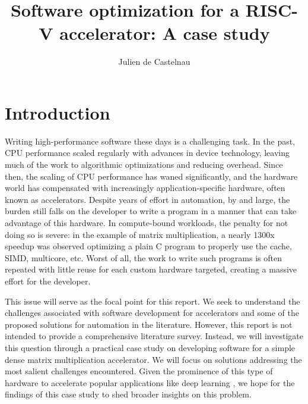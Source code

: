 \documentclass[acmsmall, nonacm=true]{acmart}
\begin{document}
\sloppy %

\title{Software optimization for a RISC-V accelerator: A case study}

\author{Julien de Castelnau}

\renewcommand{\shortauthors}{de Castelnau}


\maketitle

\section{Introduction} 
Writing high-performance software these days is a challenging task. In the past, CPU performance scaled regularly with advances in device technology, leaving much of the work to algorithmic optimizations and reducing overhead. Since then, the scaling of CPU performance has waned significantly, and the hardware world has compensated with increasingly application-specific hardware, often known as accelerators. Despite years of effort in automation, by and large, the burden still falls on the developer to write a program in a manner that can take advantage of this hardware. In compute-bound workloads, the penalty for not doing so is severe: in the example of matrix multiplication, a nearly 1300x speedup was observed optimizing a plain C program to properly use the cache, SIMD, multicore, etc. Worst of all, the work to write such programs is often repeated with little reuse for each custom hardware targeted, creating a massive effort for the developer.

This issue will serve as the focal point for this report. We seek to understand the challenges associated with software development for accelerators and some of the proposed solutions for automation in the literature. However, this report is not intended to provide a comprehensive literature survey. Instead, we will investigate this question through a practical case study on developing software for a simple dense matrix multiplication accelerator. We will focus on solutions addressing the most salient challenges encountered. Given the prominence of this type of hardware to accelerate popular applications like deep learning \cite{gemmini,tpuv1,sme,tensorcore,mma}, we hope for the findings of this case study to shed broader insights on this problem.
    
\end{document}
